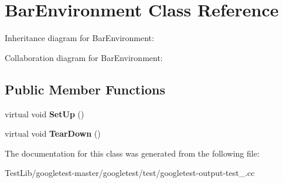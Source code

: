 \hypertarget{classBarEnvironment}{}\section{Bar\+Environment Class Reference}
\label{classBarEnvironment}


Inheritance diagram for Bar\+Environment\+:


Collaboration diagram for Bar\+Environment\+:
\subsection*{Public Member Functions}
\begin{DoxyCompactItemize}
\item 
\mbox{\label{classBarEnvironment_a88e17c5dd1dcea7a4538f2f3c6bf7bdd}} 
virtual void {\bfseries Set\+Up} ()
\item 
\mbox{\label{classBarEnvironment_a384f951da72a2a18bb0c2b3506376b09}} 
virtual void {\bfseries Tear\+Down} ()
\end{DoxyCompactItemize}


The documentation for this class was generated from the following file\+:\begin{DoxyCompactItemize}
\item 
Test\+Lib/googletest-\/master/googletest/test/googletest-\/output-\/test\+\_\+.\+cc\end{DoxyCompactItemize}
